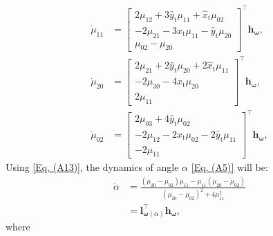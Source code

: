 \documentclass[lettersize,journal]{IEEEtran}
\begin{document}
\begin{align*}
    \dot{\mu}_{11} &= \begin{bmatrix}
        2 \mu_{12} + 3 \hat{y}_{\text{t}} \mu_{11} + \hat{x}_{\text{t}} \mu_{02} \\
        - 2 \mu_{21} - 3 \hat{x}_{\text{t}} \mu_{11} - \hat{y}_{\text{t}} \mu_{20} \\
        \mu_{02} - \mu_{20}
    \end{bmatrix}^{\top} \boldsymbol{h}_{\boldsymbol{\omega}}, \\
    \dot{\mu}_{20} &= \begin{bmatrix}
        2 \mu_{21} + 2 \hat{y}_{\text{t}} \mu_{20} + 2 \hat{x}_{\text{t}} \mu_{11} \\
        - 2 \mu_{30} - 4 \hat{x}_{\text{t}} \mu_{20} \\
        2 \mu_{11}
    \end{bmatrix}^{\top} \boldsymbol{h}_{\boldsymbol{\omega}}, \\
    \dot{\mu}_{02} &= \begin{bmatrix}
        2 \mu_{03} + 4 \hat{y}_{\text{t}} \mu_{02} \\
        - 2 \mu_{12} - 2 \hat{x}_{\text{t}} \mu_{02} - 2 \hat{y}_{\text{t}} \mu_{11} \\
        - 2 \mu_{11}
    \end{bmatrix}^{\top} \boldsymbol{h}_{\boldsymbol{\omega}},
\end{align*}
Using \eqref{Eq. (A13)}, the dynamics of angle $\alpha$ \eqref{Eq. (A5)} will be:
\begin{align} \label{Eq. (A14)}
    \dot{\alpha} &= \frac{(\mu_{20} - \mu_{02}) \dot{\mu}_{11} - \mu_{11} (\dot{\mu}_{20} - \dot{\mu}_{02})}{(\mu_{20} - \mu_{02})^2 + 4 \mu_{11}^2}\nonumber \\
    &= \boldsymbol{l}_{\boldsymbol{\omega}(\alpha)}^{\top} \boldsymbol{h}_{\boldsymbol{\omega}},
\end{align}
where
\end{document}
